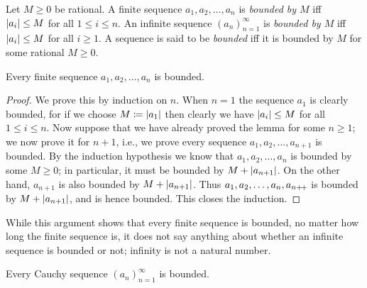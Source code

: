 \begin{defn}\label{i:5.1.12}
  Let \(M \geq 0\) be rational.
  A finite sequence \(a_1, a_2, \dots, a_n\) is \emph{bounded by \(M\)} iff \(\left\lvert a_i\right\rvert \leq M\) for all \(1 \leq i \leq n\).
  An infinite sequence \((a_n)_{n = 1}^{\infty}\) is \emph{bounded by \(M\)} iff \(\left\lvert a_i\right\rvert \leq M\) for all \(i \geq 1\).
  A sequence is said to be \emph{bounded} iff it is bounded by \(M\) for some rational \(M \geq 0\).
\end{defn}

\setcounter{thm}{13}
\begin{lem}\label{i:5.1.14}
  Every finite sequence \(a_1, a_2, \dots, a_n\) is bounded.
\end{lem}

\begin{proof}
  We prove this by induction on \(n\).
  When \(n = 1\) the sequence \(a_1\) is clearly bounded, for if we choose \(M \coloneqq \left\lvert a_1\right\rvert\) then clearly we have \(\left\lvert a_i\right\rvert \leq M\) for all \(1 \leq i \leq n\).
  Now suppose that we have already proved the lemma for some \(n \geq 1\);
  we now prove it for \(n + 1\), i.e., we prove every sequence \(a_1, a_2, \dots, a_{n + 1}\) is bounded.
  By the induction hypothesis we know that \(a_1, a_2, \dots, a_n\) is bounded by some \(M \geq 0\);
  in particular, it must be bounded by \(M + \left\lvert a_{n + 1}\right\rvert\).
  On the other hand, \(a_{n + 1}\) is also bounded by \(M + \left\lvert a_{n + 1}\right\rvert\).
  Thus \(a_1, a_2, \dots, a_n, a_{n{+}\!{+}}\) is bounded by \(M + \left\lvert a_{n + 1}\right\rvert\), and is hence bounded.
  This closes the induction.
\end{proof}

\begin{note}
  While this argument shows that every finite sequence is bounded, no matter how long the finite sequence is, it does not say anything about whether an infinite sequence is bounded or not;
  infinity is not a natural number.
\end{note}

\begin{lem}\label{i:5.1.15}
  Every Cauchy sequence \((a_n)_{n = 1}^{\infty}\) is bounded.
\end{lem}

